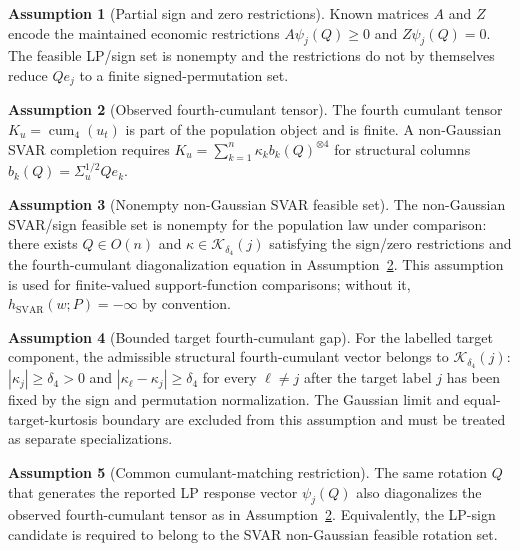 \documentclass[11pt]{article}
\theoremstyle{definition}
\newtheorem{assumption}{Assumption}
\theoremstyle{plain}
\theoremstyle{remark}
\begin{document}
\begin{assumption}[Partial sign and zero restrictions]\label{ass:sign-zero}
Known matrices \(A\) and \(Z\) encode the maintained economic restrictions \(A\psi_j(Q)\ge0\) and \(Z\psi_j(Q)=0\).  The feasible LP/sign set is nonempty and the restrictions do not by themselves reduce \(Qe_j\) to a finite signed-permutation set.
\end{assumption}

\begin{assumption}[Observed fourth-cumulant tensor]\label{ass:cumulant-tensor}
The fourth cumulant tensor \(K_u=\operatorname{cum}_4(u_t)\) is part of the population object and is finite.  A non-Gaussian SVAR completion requires \(K_u=\sum_{k=1}^n\kappa_k b_k(Q)^{\otimes4}\) for structural columns \(b_k(Q)=\Sigma_u^{1/2}Qe_k\).
\end{assumption}

\begin{assumption}[Nonempty non-Gaussian SVAR feasible set]\label{ass:svar-nonempty}
The non-Gaussian SVAR/sign feasible set is nonempty for the population law under comparison: there exists \(Q\in O(n)\) and \(\kappa\in\mathcal K_{\delta_4}(j)\) satisfying the sign/zero restrictions and the fourth-cumulant diagonalization equation in Assumption~\ref{ass:cumulant-tensor}.  This assumption is used for finite-valued support-function comparisons; without it, \(h_{\mathrm{SVAR}}(w;P)=-\infty\) by convention.
\end{assumption}

\begin{assumption}[Bounded target fourth-cumulant gap]\label{ass:bounded-gap}
For the labelled target component, the admissible structural fourth-cumulant vector belongs to \(\mathcal K_{\delta_4}(j)\): \(|\kappa_j|\ge\delta_4>0\) and \(|\kappa_\ell-\kappa_j|\ge\delta_4\) for every \(\ell\ne j\) after the target label \(j\) has been fixed by the sign and permutation normalization.  The Gaussian limit and equal-target-kurtosis boundary are excluded from this assumption and must be treated as separate specializations.
\end{assumption}

\begin{assumption}[Common cumulant-matching restriction]\label{ass:cumulant-matching}
The same rotation \(Q\) that generates the reported LP response vector \(\psi_j(Q)\) also diagonalizes the observed fourth-cumulant tensor as in Assumption~\ref{ass:cumulant-tensor}.  Equivalently, the LP-sign candidate is required to belong to the SVAR non-Gaussian feasible rotation set.
\end{assumption}
\end{document}
